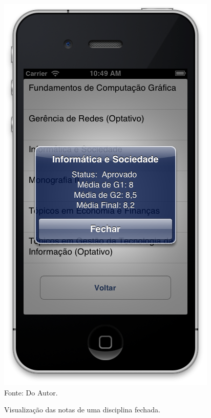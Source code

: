 \begin{figure}[!htb]
     \centering
     \caption[Formulário Notas da Graduação - Visualização de Disciplina Fechada]{Visualização das notas de uma disciplina fechada.}
     \includegraphics[scale=0.34]{imagens/formvisualizacaomediassemdetalhes.png}
     \\  Fonte: Do Autor.
\end{figure}
